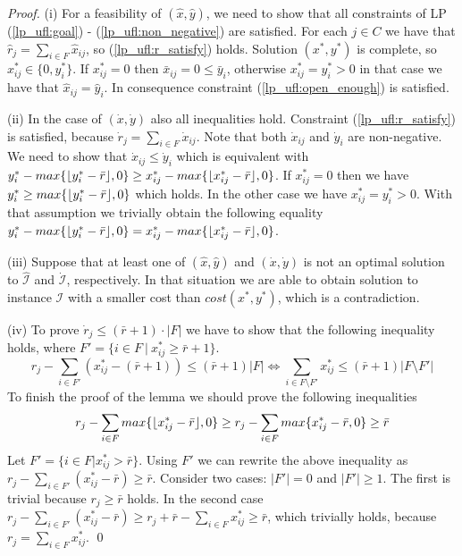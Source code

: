 \documentclass{llncs}
\DeclarePairedDelimiter{\floor}{\lfloor}{\rfloor}
\begin{document}
\begin{proof}
 (i) For a feasibility of $(\hat{x}, \hat{y})$, we need to show that all constraints of LP (\ref{lp_ufl:goal}) - (\ref{lp_ufl:non_negative}) are satisfied. For each $j \in C$ we have that $\hat{r}_j = \sum_{i \in F} \hat{x}_{ij}$, so (\ref{lp_ufl:r_satisfy}) holds. Solution $(x^*, y^*)$ is complete, so $x_{ij}^* \in \{0, y_i^*\}$. If $x_{ij}^* = 0$ then $\bar{x}_{ij} = 0 \leq \bar{y}_i$, otherwise $x_{ij}^* = {y}_i^* > 0$ in that case we have that $\hat{x}_{ij} = \hat{y}_{i}$. In consequence constraint (\ref{lp_ufl:open_enough}) is satisfied.
 
 (ii) In the case of $(\dot x, \dot y)$ also all inequalities hold. Constraint (\ref{lp_ufl:r_satisfy}) is satisfied, because $\dot r_j = \sum_{i \in F} \dot x_{ij}$. Note that both $\dot x_{ij}$ and $\dot y_i$ are non-negative. We need to show that $\dot x_{ij} \leq \dot y_i$ which is equivalent with $y_i^* - max\{\floor{y_i^* - \bar r}, 0\} \geq x_{ij}^* - max\{\floor{x_{ij}^* - \bar r}, 0\}$. If $x_{ij}^* = 0$ then we have $y_i^* \geq max\{\floor{y_i^* - \bar r}, 0\}$ which holds. In the other case we have $x_{ij}^* = y_i^* > 0$. With that assumption we trivially obtain the following equality $y_i^* - max\{\floor{y_i^* - \bar r}, 0\} = x_{ij}^* - max\{\floor{x_{ij}^* - \bar r}, 0\}$.
 
 (iii) Suppose that at least one of $(\hat{x}, \hat{y})$ and $(\dot x, \dot y)$ is not an optimal solution to $\mathcal{\hat I}$ and $\mathcal{\dot I}$, respectively. In that situation we are able to obtain solution to instance $\mathcal{I}$ with a smaller cost than $cost(x^*, y^*)$, which is a contradiction.
 
 (iv) To prove $\dot r_j \leq (\bar r + 1) \cdot |F|$ we have to show that the following inequality holds,  where $F' = \{i \in F ~|~ x_{ij}^* \geq \bar r + 1\}$. $$r_j - \sum_{i \in F'} (x_{ij}^* - (\bar r + 1)) \leq (\bar r + 1)|F| \iff \sum_{i \in F \setminus F'} x_{ij}^* \leq (\bar r + 1) |F \setminus F'|$$
 To finish the proof of the lemma we should prove the following inequalities
 $$r_j - \sum_{i \in F} max\{\floor{x_{ij}^* - \bar r}, 0\} \geq r_j - \sum_{i \in F} max\{x_{ij}^* - \bar r, 0\} \geq \bar r$$
 Let $F' = \{i \in F | x_{ij}^* > \bar r\}$. Using $F'$ we can rewrite the above inequality as $r_j - \sum_{i \in F'} (x_{ij}^* - \bar r) \geq \bar r$. Consider two cases: $|F'| = 0$ and $|F'| \geq 1$. The first is trivial because $r_j \geq \bar r$ holds. In the second case $r_j - \sum_{i \in F'} (x_{ij}^* - \bar r) \geq r_j + \bar r - \sum_{i \in F}x_{ij}^* \geq \bar r$, which trivially holds, because $r_j = \sum_{i \in F}x_{ij}^*$.
\qed
\end{proof}
\end{document}
